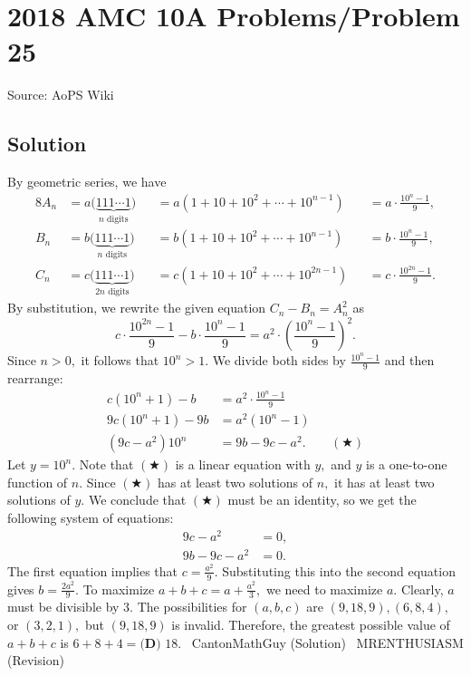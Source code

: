 \documentclass[12pt]{article}
\begin{document}
\section*{{2018 AMC 10A Problems/Problem 25}}
Source: AoPS Wiki

\subsection*{Solution}
By geometric series, we have \begin{alignat*}{8} A_n&=a\bigl(\phantom{ }\underbrace{111\cdots1}_{n\text{ digits}}\phantom{ }\bigr)&&=a\left(1+10+10^2+\cdots+10^{n-1}\right)&&=a\cdot\frac{10^n-1}{9}, \\ B_n&=b\bigl(\phantom{ }\underbrace{111\cdots1}_{n\text{ digits}}\phantom{ }\bigr)&&=b\left(1+10+10^2+\cdots+10^{n-1}\right)&&=b\cdot\frac{10^n-1}{9}, \\ C_n&=c\bigl(\phantom{ }\underbrace{111\cdots1}_{2n\text{ digits}}\phantom{ }\bigr)&&=c\left(1+10+10^2+\cdots+10^{2n-1}\right)&&=c\cdot\frac{10^{2n}-1}{9}. \end{alignat*} By substitution, we rewrite the given equation $C_n - B_n = A_n^2$ as \[c\cdot\frac{10^{2n}-1}{9} - b\cdot\frac{10^n-1}{9} = a^2\cdot\left(\frac{10^n-1}{9}\right)^2.\] Since $n > 0,$ it follows that $10^n > 1.$ We divide both sides by $\frac{10^n-1}{9}$ and then rearrange: \begin{align*} c\left(10^n+1\right) - b &= a^2\cdot\frac{10^n-1}{9} \\ 9c\left(10^n+1\right) - 9b &= a^2\left(10^n-1\right) \\ \left(9c-a^2\right)10^n &= 9b-9c-a^2. &&(\bigstar) \end{align*} Let $y=10^n.$ Note that $(\bigstar)$ is a linear equation with $y,$ and $y$ is a one-to-one function of $n.$ Since $(\bigstar)$ has at least two solutions of $n,$ it has at least two solutions of $y.$ We conclude that $(\bigstar)$ must be an identity, so we get the following system of equations: \begin{align*} 9c-a^2&=0, \\ 9b-9c-a^2&=0. \end{align*} The first equation implies that $c=\frac{a^2}{9}.$ Substituting this into the second equation gives $b=\frac{2a^2}{9}.$ To maximize $a + b + c = a + \frac{a^2}{3},$ we need to maximize $a.$ Clearly, $a$ must be divisible by $3.$ The possibilities for $(a,b,c)$ are $(9,18,9),(6,8,4),$ or $(3,2,1),$ but $(9,18,9)$ is invalid. Therefore, the greatest possible value of $a + b + c$ is $6+8+4=\boxed{\textbf{(D) } 18}.$ ~CantonMathGuy (Solution) ~MRENTHUSIASM (Revision)
\end{document}

